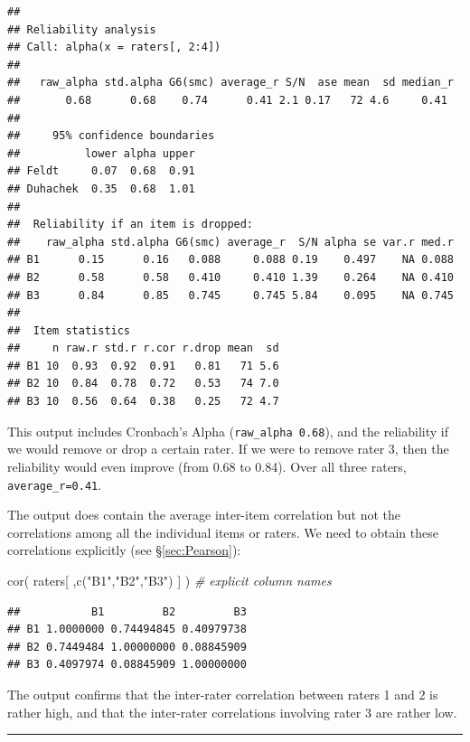 \documentclass[
]{book}
\newenvironment{Shaded}{\begin{snugshade}}{\end{snugshade}}
\newcommand{\CommentTok}[1]{\textcolor[rgb]{0.56,0.35,0.01}{\textit{#1}}}
\newcommand{\FunctionTok}[1]{\textcolor[rgb]{0.00,0.00,0.00}{#1}}
\newcommand{\NormalTok}[1]{#1}
\newcommand{\StringTok}[1]{\textcolor[rgb]{0.31,0.60,0.02}{#1}}
\begin{document}
\begin{verbatim}
## 
## Reliability analysis   
## Call: alpha(x = raters[, 2:4])
## 
##   raw_alpha std.alpha G6(smc) average_r S/N  ase mean  sd median_r
##       0.68      0.68    0.74      0.41 2.1 0.17   72 4.6     0.41
## 
##     95% confidence boundaries 
##          lower alpha upper
## Feldt     0.07  0.68  0.91
## Duhachek  0.35  0.68  1.01
## 
##  Reliability if an item is dropped:
##    raw_alpha std.alpha G6(smc) average_r  S/N alpha se var.r med.r
## B1      0.15      0.16   0.088     0.088 0.19    0.497    NA 0.088
## B2      0.58      0.58   0.410     0.410 1.39    0.264    NA 0.410
## B3      0.84      0.85   0.745     0.745 5.84    0.095    NA 0.745
## 
##  Item statistics 
##     n raw.r std.r r.cor r.drop mean  sd
## B1 10  0.93  0.92  0.91   0.81   71 5.6
## B2 10  0.84  0.78  0.72   0.53   74 7.0
## B3 10  0.56  0.64  0.38   0.25   72 4.7
\end{verbatim}

This output includes Cronbach's Alpha (\texttt{raw\_alpha\ 0.68}), and the
reliability if we would remove or drop a certain rater.
If we were to remove rater 3, then the reliability would even
improve (from 0.68 to 0.84). Over all three raters,
\texttt{average\_r=0.41}.

The output does contain the average inter-item correlation but not the correlations among all the individual items or raters.
We need to obtain these correlations explicitly (see §\ref{sec:Pearson}):

\begin{Shaded}
\begin{Highlighting}[]
\FunctionTok{cor}\NormalTok{( raters[ ,}\FunctionTok{c}\NormalTok{(}\StringTok{"B1"}\NormalTok{,}\StringTok{"B2"}\NormalTok{,}\StringTok{"B3"}\NormalTok{) ] ) }\CommentTok{\# explicit column names}
\end{Highlighting}
\end{Shaded}

\begin{verbatim}
##           B1         B2         B3
## B1 1.0000000 0.74494845 0.40979738
## B2 0.7449484 1.00000000 0.08845909
## B3 0.4097974 0.08845909 1.00000000
\end{verbatim}

The output confirms that the inter-rater correlation between raters 1 and 2 is rather high, and that the inter-rater correlations involving rater 3 are rather low.

\begin{center}\rule{0.5\linewidth}{0.5pt}\end{center}
\end{document}

